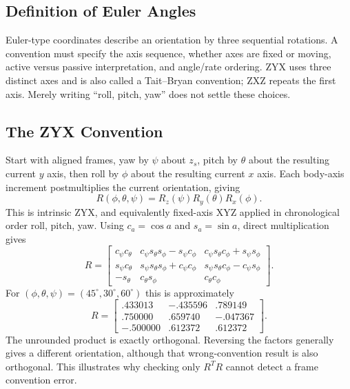 \subsection{Definition of Euler Angles}

Euler-type coordinates describe an orientation by three sequential rotations. A convention must specify the axis sequence, whether axes are fixed or moving, active versus passive interpretation, and angle/rate ordering. ZYX uses three distinct axes and is also called a Tait--Bryan convention; ZXZ repeats the first axis. Merely writing ``roll, pitch, yaw'' does not settle these choices.

\subsection{The ZYX Convention}

Start with aligned frames, yaw by $\psi$ about $z_s$, pitch by $\theta$ about the resulting current $y$ axis, then roll by $\phi$ about the resulting current $x$ axis. Each body-axis increment postmultiplies the current orientation, giving
\begin{equation}
 R(\phi,\theta,\psi)=R_z(\psi)R_y(\theta)R_x(\phi).
 \label{eq:euler_zyx}
\end{equation}
This is intrinsic ZYX, and equivalently fixed-axis XYZ applied in chronological order roll, pitch, yaw. Using $c_a=\cos a$ and $s_a=\sin a$, direct multiplication gives
\begin{equation}
 R=\begin{bmatrix}
 c_\psi c_\theta&c_\psi s_\theta s_\phi-s_\psi c_\phi&c_\psi s_\theta c_\phi+s_\psi s_\phi\\
 s_\psi c_\theta&s_\psi s_\theta s_\phi+c_\psi c_\phi&s_\psi s_\theta c_\phi-c_\psi s_\phi\\
 -s_\theta&c_\theta s_\phi&c_\theta c_\phi
 \end{bmatrix}.
 \label{eq:euler_zyx_full}
\end{equation}
For $(\phi,\theta,\psi)=(45^\circ,30^\circ,60^\circ)$ this is approximately
\begin{equation}
 R=\begin{bmatrix}
 .433013&-.435596&.789149\\
 .750000&.659740&-.047367\\
 -.500000&.612372&.612372
 \end{bmatrix}.
 \label{eq:euler_numeric_example}
\end{equation}
The unrounded product is exactly orthogonal. Reversing the factors generally gives a different orientation, although that wrong-convention result is also orthogonal. This illustrates why checking only $R^TR$ cannot detect a frame convention error.

